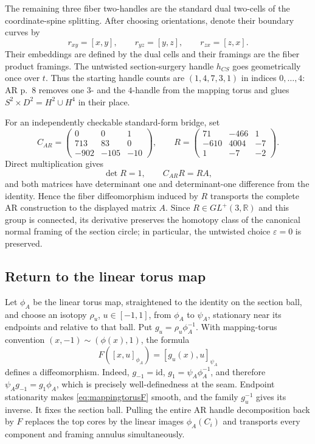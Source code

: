 The remaining three fiber two-handles are the standard dual two-cells of the
coordinate-spine splitting.  After choosing orientations, denote their
boundary curves by
\[
r_{xy}=[x,y],\qquad r_{yz}=[y,z],\qquad r_{zx}=[z,x].
\]
Their embeddings are defined by the dual cells and their framings are the
fiber product framings.  The untwisted section-surgery handle $h_{CS}$ goes
geometrically once over $t$.  Thus the starting handle counts are
$(1,4,7,3,1)$ in indices $0,\ldots,4$: AR p.~8 removes one $3$- and the
$4$-handle from the mapping torus and glues
$S^2\times D^2=H^2\cup H^4$ in their place.

For an independently checkable standard-form bridge, set
\[
C_{AR}=\begin{pmatrix}0&0&1\\713&83&0\\-902&-105&-10\end{pmatrix},
\qquad
R=\begin{pmatrix}71&-466&1\\-610&4004&-7\\1&-7&-2\end{pmatrix}.
\]
Direct multiplication gives
\[
\det R=1,\qquad C_{AR}R=RA,
\]
and both matrices have determinant one and determinant-one difference from
the identity.  Hence the fiber diffeomorphism induced by $R$ transports the
complete AR construction to the displayed matrix $A$.  Since
$R\in GL^+(3,\mathbb R)$ and this group is connected, its derivative preserves
the homotopy class of the canonical normal framing of the section circle; in
particular, the untwisted choice $\varepsilon=0$ is preserved.

\subsection{Return to the linear torus map}

Let $\phi_A$ be the linear torus map, straightened to the identity on the
section ball, and choose an isotopy $\rho_u$, $u\in[-1,1]$, from $\phi_A$ to
$\psi_A$, stationary near its endpoints and relative to that ball.  Put
$g_u=\rho_u\phi_A^{-1}$.  With mapping-torus convention
$(x,-1)\sim(\phi(x),1)$, the formula
\begin{equation}\label{eq:mappingtorusF}
F([x,u]_{\phi_A})=[g_u(x),u]_{\psi_A}
\end{equation}
defines a diffeomorphism.  Indeed, $g_{-1}=\mathrm{id}$,
$g_1=\psi_A\phi_A^{-1}$, and therefore
$\psi_Ag_{-1}=g_1\phi_A$, which is precisely well-definedness at the seam.
Endpoint stationarity makes \eqref{eq:mappingtorusF} smooth, and the family
$g_u^{-1}$ gives its inverse.  It fixes the section ball.  Pulling the entire
AR handle decomposition back by $F$ replaces the top cores by the linear
images $\phi_A(C_i)$ and transports every component and framing annulus
simultaneously.

